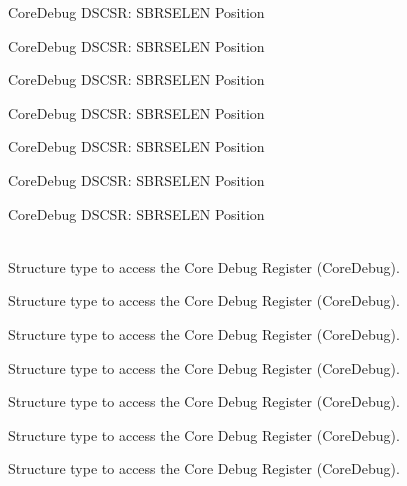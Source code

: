 \begin{DoxyRefList}
\label{deprecated__deprecated000151}%
%
Core\+Debug DSCSR:\+ SBRSELEN Position 

\label{deprecated__deprecated000227}%
%
Core\+Debug DSCSR:\+ SBRSELEN Position 

\label{deprecated__deprecated000290}%
%
Core\+Debug DSCSR:\+ SBRSELEN Position 

\label{deprecated__deprecated000369}%
%
Core\+Debug DSCSR:\+ SBRSELEN Position 

\label{deprecated__deprecated000445}%
%
Core\+Debug DSCSR:\+ SBRSELEN Position 

\label{deprecated__deprecated000548}%
%
Core\+Debug DSCSR:\+ SBRSELEN Position 

\label{deprecated__deprecated000650}%
%
Core\+Debug DSCSR:\+ SBRSELEN Position  
\item[{\parbox[t]{\linewidth}{Struct \doxylink{structCoreDebug__Type}{Core\+Debug\+\_\+\+Type} }}]\hfill \\
\label{deprecated__deprecated000004}%
%
Structure type to access the Core Debug Register (Core\+Debug). 

\label{deprecated__deprecated000104}%
%
Structure type to access the Core Debug Register (Core\+Debug). 

\label{deprecated__deprecated000158}%
%
Structure type to access the Core Debug Register (Core\+Debug). 

\label{deprecated__deprecated000243}%
%
Structure type to access the Core Debug Register (Core\+Debug). 

\label{deprecated__deprecated000300}%
%
Structure type to access the Core Debug Register (Core\+Debug). 

\label{deprecated__deprecated000376}%
%
Structure type to access the Core Debug Register (Core\+Debug). 

\label{deprecated__deprecated000455}%
%
Structure type to access the Core Debug Register (Core\+Debug). 


\end{DoxyRefList}
